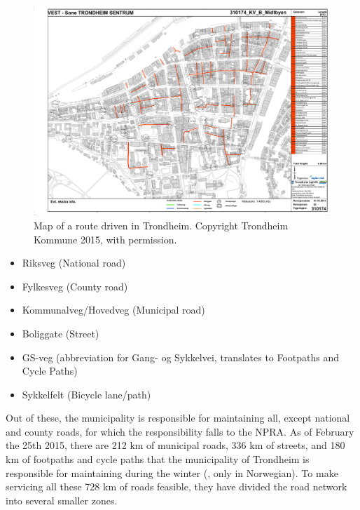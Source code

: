 \begin{landscape}
\begin{figure}[thbp]
    \centerline{\includegraphics[height=0.945\textwidth]{figures/Routes/PreExisting/310174.pdf}}
    \caption{Map of a route driven in Trondheim. Copyright Trondheim Kommune 2015, with permission.}
    \label{fig:map_KV_B_used}
\end{figure}
\end{landscape}

\begin{itemize}
    \item Riksveg (National road)
    \item Fylkesveg (County road)
    \item Kommunalveg/Hovedveg (Municipal road)
    \item Boliggate (Street)
    \item GS-veg (abbreviation for Gang- og Sykkelvei, translates to Footpaths and Cycle Paths) %
    \item Sykkelfelt (Bicycle lane/path)
\end{itemize}

Out of these, the municipality is responsible for maintaining all, except national and county roads, for which the responsibility falls to the NPRA. As of February the 25th 2015, there are 212 km of municipal roads, 336 km of streets, and 180 km of footpaths and cycle paths that the municipality of Trondheim is responsible for maintaining during the winter (\citep{trondheimKommuneVinterdriftNettside}, only in Norwegian). To make servicing all these 728 km of roads feasible, they have divided the road network into several smaller zones.

